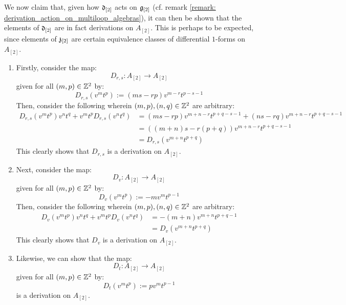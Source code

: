 \begin{remark}
            We now claim that, given how $\mathfrak{d}_{[2]}$ acts on $\mathfrak{g}_{[2]}$ (cf. remark \ref{remark: derivation_action_on_multiloop_algebras}), it can then be shown that the elements of $\mathfrak{d}_{[2]}$ are in fact derivations on $A_{[2]}$. This is perhaps to be expected, since elements of $\mathfrak{z}_{[2]}$ are certain equivalence classes of differential $1$-forms on $A_{[2]}$.
            \begin{enumerate}
                \item Firstly, consider the map:
                    $$D_{r, s}: A_{[2]} \to A_{[2]}$$
                given for all $(m, p) \in \mathbb{Z}^2$ by:
                    $$D_{r, s}(v^m t^p) := ( ms - rp ) v^{m - r} t^{p - s - 1}$$
                Then, consider the following wherein $(m, p), (n, q) \in \mathbb{Z}^2$ are arbitrary:
                    $$
                        \begin{aligned}
                            D_{r, s}(v^m t^p) v^n t^q + v^m t^p D_{r, s}(v^n t^q) & = ( ms - rp ) v^{m + n - r} t^{p + q - s - 1} + ( ns - rq ) v^{m + n - r} t^{p + q - s - 1}
                            \\
                            & = ( (m + n)s - r(p + q) ) v^{m + n - r} t^{p + q - s - 1}
                            \\
                            & = D_{r, s}( v^{m + n} t^{p + q} )
                        \end{aligned}
                    $$
                This clearly shows that $D_{r, s}$ is a derivation on $A_{[2]}$.
                \item Next, consider the map:
                    $$D_v: A_{[2]} \to A_{[2]}$$
                given for all $(m, p) \in \mathbb{Z}^2$ by:
                    $$D_v(v^m t^p) := -m v^m t^{p - 1}$$
                Then, consider the following wherein $(m, p), (n, q) \in \mathbb{Z}^2$ are arbitrary:
                    $$
                        \begin{aligned}
                            D_v(v^m t^p) v^n t^q + v^m t^p D_v(v^n t^q) & = -(m + n) v^{m + n} t^{p + q - 1}
                            \\
                            & = D_v( v^{m + n} t^{p + q} )
                        \end{aligned}
                    $$
                This clearly shows that $D_v$ is a derivation on $A_{[2]}$.
                \item Likewise, we can show that the map:
                    $$D_t: A_{[2]} \to A_{[2]}$$
                given for all $(m, p) \in \mathbb{Z}^2$ by:
                    $$D_t(v^m t^p) := p v^m t^{p - 1}$$
                is a derivation on $A_{[2]}$.
            \end{enumerate}


\end{remark}
